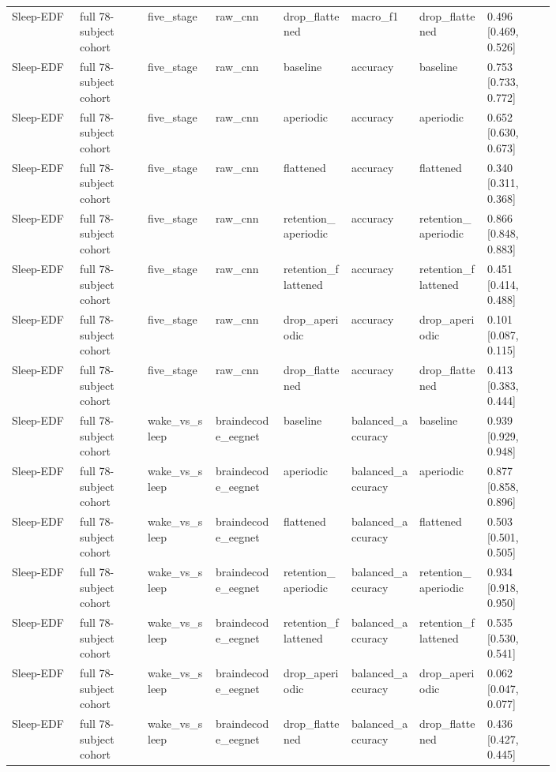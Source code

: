 \begin{longtable}{p{0.10\linewidth}p{0.10\linewidth}p{0.10\linewidth}p{0.10\linewidth}p{0.10\linewidth}p{0.10\linewidth}p{0.10\linewidth}p{0.10\linewidth}}
Sleep-EDF & full 78-subject cohort & five\_stage & raw\_cnn & drop\_flattened & macro\_f1 & drop\_flattened & 0.496 [0.469, 0.526]\\
Sleep-EDF & full 78-subject cohort & five\_stage & raw\_cnn & baseline & accuracy & baseline & 0.753 [0.733, 0.772]\\
Sleep-EDF & full 78-subject cohort & five\_stage & raw\_cnn & aperiodic & accuracy & aperiodic & 0.652 [0.630, 0.673]\\
Sleep-EDF & full 78-subject cohort & five\_stage & raw\_cnn & flattened & accuracy & flattened & 0.340 [0.311, 0.368]\\
Sleep-EDF & full 78-subject cohort & five\_stage & raw\_cnn & retention\_aperiodic & accuracy & retention\_aperiodic & 0.866 [0.848, 0.883]\\
Sleep-EDF & full 78-subject cohort & five\_stage & raw\_cnn & retention\_flattened & accuracy & retention\_flattened & 0.451 [0.414, 0.488]\\
Sleep-EDF & full 78-subject cohort & five\_stage & raw\_cnn & drop\_aperiodic & accuracy & drop\_aperiodic & 0.101 [0.087, 0.115]\\
Sleep-EDF & full 78-subject cohort & five\_stage & raw\_cnn & drop\_flattened & accuracy & drop\_flattened & 0.413 [0.383, 0.444]\\
Sleep-EDF & full 78-subject cohort & wake\_vs\_sleep & braindecode\_eegnet & baseline & balanced\_accuracy & baseline & 0.939 [0.929, 0.948]\\
Sleep-EDF & full 78-subject cohort & wake\_vs\_sleep & braindecode\_eegnet & aperiodic & balanced\_accuracy & aperiodic & 0.877 [0.858, 0.896]\\
Sleep-EDF & full 78-subject cohort & wake\_vs\_sleep & braindecode\_eegnet & flattened & balanced\_accuracy & flattened & 0.503 [0.501, 0.505]\\
Sleep-EDF & full 78-subject cohort & wake\_vs\_sleep & braindecode\_eegnet & retention\_aperiodic & balanced\_accuracy & retention\_aperiodic & 0.934 [0.918, 0.950]\\
Sleep-EDF & full 78-subject cohort & wake\_vs\_sleep & braindecode\_eegnet & retention\_flattened & balanced\_accuracy & retention\_flattened & 0.535 [0.530, 0.541]\\
Sleep-EDF & full 78-subject cohort & wake\_vs\_sleep & braindecode\_eegnet & drop\_aperiodic & balanced\_accuracy & drop\_aperiodic & 0.062 [0.047, 0.077]\\
Sleep-EDF & full 78-subject cohort & wake\_vs\_sleep & braindecode\_eegnet & drop\_flattened & balanced\_accuracy & drop\_flattened & 0.436 [0.427, 0.445]\\

\end{longtable}
